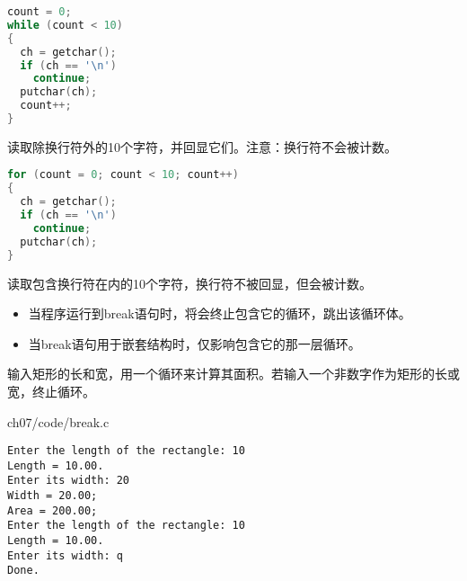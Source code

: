 \begin{frame}[fragile]
\begin{lstlisting}[language=c,frame=single]
count = 0;
while (count < 10)
{
  ch = getchar();
  if (ch == '\n')
    continue;
  putchar(ch);
  count++;
}
\end{lstlisting}
读取除换行符外的10个字符，并回显它们。注意：换行符不会被计数。
\end{frame}

\begin{frame}[fragile]
\begin{lstlisting}[language=c,frame=single]
for (count = 0; count < 10; count++)
{
  ch = getchar();
  if (ch == '\n')
    continue;
  putchar(ch);
}
\end{lstlisting}
读取包含换行符在内的10个字符，换行符不被回显，但会被计数。
\end{frame}

\begin{frame}[fragile]
\begin{itemize}
\item
当程序运行到break语句时，将会终止包含它的循环，跳出该循环体。\\[0.1in]
\item
当break语句用于嵌套结构时，仅影响包含它的那一层循环。
\end{itemize}
\end{frame}

\begin{frame}[fragile]
\begin{li}
输入矩形的长和宽，用一个循环来计算其面积。若输入一个非数字作为矩形的长或宽，终止循环。
\end{li}
\end{frame}

\begin{frame}


            {ch07/code/break.c}
\end{frame}


\begin{frame}[fragile]
\begin{lstlisting}[backgroundcolor=\color{red!10}]
Enter the length of the rectangle: 10
Length = 10.00.
Enter its width: 20
Width = 20.00;
Area = 200.00; 
Enter the length of the rectangle: 10
Length = 10.00.
Enter its width: q
Done.
\end{lstlisting}
\end{frame}

